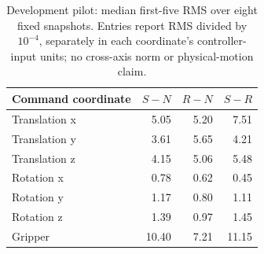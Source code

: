 \begin{table}[!h]
\centering
\caption{Development pilot: median first-five RMS over eight fixed snapshots. Entries report RMS divided by $10^{-4}$, separately in each coordinate's controller-input units; no cross-axis norm or physical-motion claim.}
\label{tab:pulse}
\begin{tabular}{@{}lrrr@{}}\toprule
Command coordinate & $S-N$ & $R-N$ & $S-R$\\\midrule
Translation x & 5.05 & 5.20 & 7.51\\
Translation y & 3.61 & 5.65 & 4.21\\
Translation z & 4.15 & 5.06 & 5.48\\
Rotation x & 0.78 & 0.62 & 0.45\\
Rotation y & 1.17 & 0.80 & 1.11\\
Rotation z & 1.39 & 0.97 & 1.45\\
Gripper & 10.40 & 7.21 & 11.15\\
\bottomrule
\end{tabular}
\end{table}
